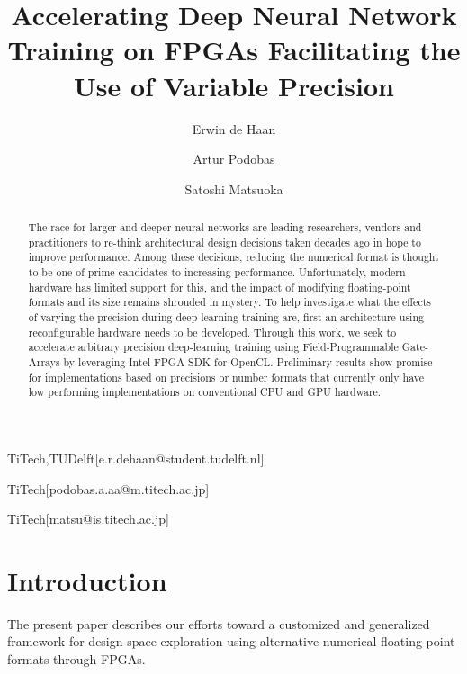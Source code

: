 \documentclass[techrep,english]{ipsj} %
\begin{document}
\title{Accelerating Deep Neural Network Training on FPGAs Facilitating the Use of Variable Precision}


\author{Erwin de Haan}{TiTech,TUDelft}[e.r.dehaan@student.tudelft.nl]
\author{Artur Podobas}{TiTech}[podobas.a.aa@m.titech.ac.jp]
\author{Satoshi Matsuoka}{TiTech}[matsu@is.titech.ac.jp]

\begin{abstract}
The race for larger and deeper neural networks are leading researchers, vendors and practitioners to re-think architectural design decisions taken decades ago in hope to improve performance.
Among these decisions, reducing the numerical format is thought to be one of prime candidates to increasing performance.
Unfortunately, modern hardware has limited support for this, and the impact of modifying floating-point formats and its size remains shrouded in mystery.
To help investigate what the effects of varying the precision during deep-learning training are, first an architecture using reconfigurable hardware needs to be developed.
Through this work, we seek to accelerate arbitrary precision deep-learning training using Field-Programmable Gate-Arrays by leveraging Intel FPGA SDK for OpenCL.
Preliminary results show promise for implementations based on precisions or number formats that currently only have low performing implementations on conventional CPU and GPU hardware.
\end{abstract}


\maketitle

\section{Introduction}
The present paper describes our efforts toward a customized and generalized framework for design-space exploration using alternative numerical floating-point formats through FPGAs.
\end{document}
